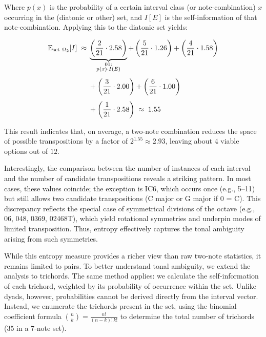 \documentclass[10pt,twocolumn]{article}
\numberwithin{equation}{section} %
\begin{document}
Where $p(x)$ is the probability of a certain interval class
(or note-combination) $x$ occurring in the (diatonic or other) set, and $I[E]$ is the self-information of that
note-combination. Applying this to the diatonic set yields:

\begin{align}
\mathbb{E}_{\text{set}~\Omega_{2}}[I] \;\approx\; &
\underbrace{\left( \frac{2}{21} \cdot 2.58 \right)}_{\substack{\text{01:}\\ p(x)\cdot I(E)}} +
\left( \frac{5}{21} \cdot 1.26 \right) +
\left( \frac{4}{21} \cdot 1.58 \right)
\notag \\[4pt]
&+ \left( \frac{3}{21} \cdot 2.00 \right) +
\left( \frac{6}{21} \cdot 1.00 \right)
\notag \\[4pt]
&+ \left( \frac{1}{21} \cdot 2.58 \right)
\;\approx\; 1.55
\label{eq:expectation-example}
\end{align}

This result indicates that, on average, a two‑note combination
reduces the space of possible transpositions by a factor of $2^{1.55} \approx 2.93$,
leaving about $4$ viable options out of $12$.




Interestingly, the comparison between the number of
instances of each interval and the number of candidate transpositions reveals a
striking pattern. In most cases, these values coincide; the exception is IC6,
which occurs once (e.g., 5–11) but still allows two candidate transpositions (C
major or G\text{$\flat$} major if 0 = C). This discrepancy reflects the
special case of symmetrical divisions of the octave (e.g., 06, 048, 0369,
02468T), which yield rotational symmetries and underpin modes of limited
transposition. Thus, entropy effectively captures the tonal ambiguity arising
from such symmetries.




While this entropy measure provides a richer view than raw two-note
statistics, it remains limited to pairs. To better understand tonal ambiguity,
we extend the analysis to trichords. The same method applies: we calculate the self-information
of each trichord, weighted by its probability of occurrence within the set.
Unlike dyads, however, probabilities cannot be derived directly from the
interval vector. Instead, we enumerate the trichords present in the set, using
the binomial coefficient formula $\binom{n}{k} = \frac{n!}{(n-k)! \, k!}$ to determine
the total number of trichords (35 in a 7‑note set).


\end{document}
